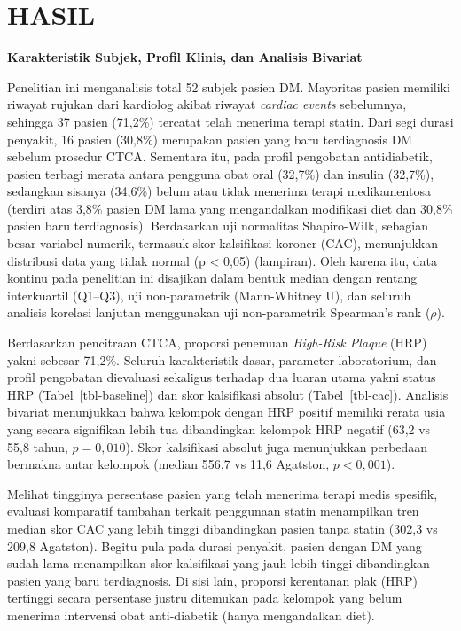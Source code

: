 \documentclass[
  indonesian,
]{agujournal2019}
\begin{document}
\section{HASIL}\label{hasil}

\textbf{Karakteristik Subjek, Profil Klinis, dan Analisis Bivariat}

Penelitian ini menganalisis total 52 subjek pasien DM. Mayoritas pasien
memiliki riwayat rujukan dari kardiolog akibat riwayat \emph{cardiac
events} sebelumnya, sehingga 37 pasien (71,2\%) tercatat telah menerima
terapi statin. Dari segi durasi penyakit, 16 pasien (30,8\%) merupakan
pasien yang baru terdiagnosis DM sebelum prosedur CTCA. Sementara itu,
pada profil pengobatan antidiabetik, pasien terbagi merata antara
pengguna obat oral (32,7\%) dan insulin (32,7\%), sedangkan sisanya
(34,6\%) belum atau tidak menerima terapi medikamentosa (terdiri atas
3,8\% pasien DM lama yang mengandalkan modifikasi diet dan 30,8\% pasien
baru terdiagnosis). Berdasarkan uji normalitas Shapiro-Wilk, sebagian
besar variabel numerik, termasuk skor kalsifikasi koroner (CAC),
menunjukkan distribusi data yang tidak normal (p \textless{} 0,05)
(lampiran). Oleh karena itu, data kontinu pada penelitian ini disajikan
dalam bentuk median dengan rentang interkuartil (Q1--Q3), uji
non-parametrik (Mann-Whitney U), dan seluruh analisis korelasi lanjutan
menggunakan uji non-parametrik Spearman's rank (\(\rho\)).

Berdasarkan pencitraan CTCA, proporsi penemuan \emph{High-Risk Plaque}
(HRP) yakni sebesar 71,2\%. Seluruh karakteristik dasar, parameter
laboratorium, dan profil pengobatan dievaluasi sekaligus terhadap dua
luaran utama yakni status HRP (Tabel~\ref{tbl-baseline}) dan skor
kalsifikasi absolut (Tabel~\ref{tbl-cac}). Analisis bivariat menunjukkan
bahwa kelompok dengan HRP positif memiliki rerata usia yang secara
signifikan lebih tua dibandingkan kelompok HRP negatif (63,2 vs 55,8
tahun, \(p = 0,010\)). Skor kalsifikasi absolut juga menunjukkan
perbedaan bermakna antar kelompok (median 556,7 vs 11,6 Agatston,
\(p < 0,001\)).

Melihat tingginya persentase pasien yang telah menerima terapi medis
spesifik, evaluasi komparatif tambahan terkait penggunaan statin
menampilkan tren median skor CAC yang lebih tinggi dibandingkan pasien
tanpa statin (302,3 vs 209,8 Agatston). Begitu pula pada durasi
penyakit, pasien dengan DM yang sudah lama menampilkan skor kalsifikasi
yang jauh lebih tinggi dibandingkan pasien yang baru terdiagnosis. Di
sisi lain, proporsi kerentanan plak (HRP) tertinggi secara persentase
justru ditemukan pada kelompok yang belum menerima intervensi obat
anti-diabetik (hanya mengandalkan diet).
\end{document}
